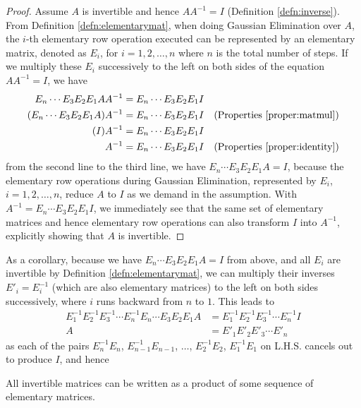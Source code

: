 \begin{proof}
Assume $A$ is invertible and hence $AA^{-1} = I$ (Definition \ref{defn:inverse}). From Definition \ref{defn:elementarymat}, when doing Gaussian Elimination over $A$, the $i$-th elementary row operation executed can be represented by an elementary matrix, denoted as $E_{i}$, for $i = 1,2,\ldots,n$ where $n$ is the total number of steps. If we multiply these $E_{i}$ successively to the left on both sides of the equation $AA^{-1} = I$, we have
\begin{align*}
E_n \cdots E_{3}E_{2}E_{1} AA^{-1} &= E_n \cdots E_{3}E_{2}E_{1}I \\
(E_n \cdots E_{3}E_{2}E_{1}A) A^{-1} &= E_n \cdots E_{3}E_{2}E_{1}I & \text{(Properties \ref{proper:matmul})} \\
(I)A^{-1} &= E_n \cdots E_{3}E_{2}E_{1}I \\
A^{-1} &= E_n \cdots E_{3}E_{2}E_{1}I & \text{(Properties \ref{proper:identity})}
\end{align*}
from the second line to the third line, we have $E_n \cdots E_{3}E_{2}E_{1}A = I$, because the elementary row operations during Gaussian Elimination, represented by $E_i$, $i = 1,2,\ldots,n$, reduce $A$ to $I$ as we demand in the assumption. With $A^{-1} = E_n \cdots E_{3}E_{2}E_{1}I$, we immediately see that the same set of elementary matrices and hence elementary row operations can also transform $I$ into $A^{-1}$, explicitly showing that $A$ is invertible.    
\end{proof}
As a corollary, because we have $E_n \cdots E_{3}E_{2}E_{1}A = I$ from above, and all $E_i$ are invertible by Definition \ref{defn:elementarymat}, we can multiply their inverses $E'_i = E_i^{-1}$ (which are also elementary matrices) to the left on both sides successively, where $i$ runs backward from $n$ to $1$. This leads to
\begin{align}
E_{1}^{-1}E_{2}^{-1}E_{3}^{-1}\cdots E_n^{-1}E_n \cdots E_{3}E_{2}E_{1}A &= E_{1}^{-1}E_{2}^{-1}E_{3}^{-1}\cdots E_n^{-1}I \nonumber \\
A &= E'_{1}E'_{2}E'_{3}\cdots E'_n
\end{align}
as each of the pairs $E_n^{-1}E_n$, $E_{n-1}^{-1}E_{n-1}$, $\ldots$, $E_2^{-1}E_2$, $E_1^{-1}E_1$ on L.H.S. cancels out to produce $I$, and hence
\begin{proper}
\label{proper:invseqelement}
All invertible matrices can be written as a product of some sequence of elementary matrices. 
\end{proper}

